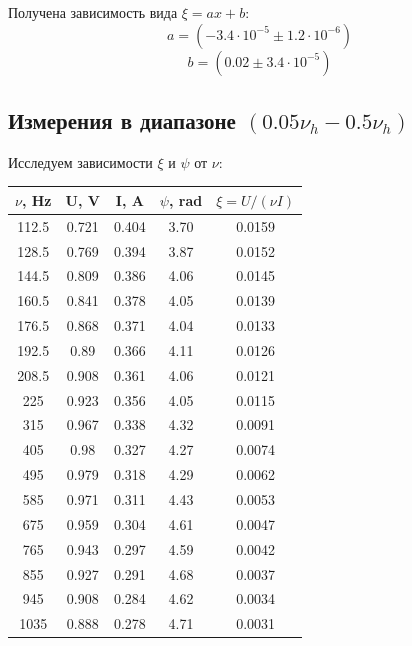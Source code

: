 \documentclass{article}
\begin{document}
Получена зависимость вида \( \xi = ax + b \):
\[ a = (-3.4\cdot 10^{-5} \pm 1.2\cdot 10^{-6}) \]
\[ b = (0.02 \pm 3.4\cdot 10^{-5}) \]
\subsection{Измерения в диапазоне \((0.05\nu_h - 0.5\nu_h)\)}
Исследуем зависимости \(\xi\) и \(\psi\) от \(\nu\):
\begin{table}[H]
    \centering
    \begin{tabular}{|c|c|c|c|c|}
    \hline
    \(\nu\), Hz & U, V  & I, A  & \(\psi\), rad & \(\xi = U/(\nu I)\) \\\hline
    112.5  & 0.721 & 0.404 & 3.70 & 0.0159\\\hline
    128.5  & 0.769 & 0.394 & 3.87 & 0.0152\\\hline
    144.5  & 0.809 & 0.386 & 4.06 & 0.0145\\\hline
    160.5  & 0.841 & 0.378 & 4.05 & 0.0139\\\hline
    176.5  & 0.868 & 0.371 & 4.04 & 0.0133\\\hline
    192.5  & 0.89  & 0.366 & 4.11 & 0.0126\\\hline
    208.5  & 0.908 & 0.361 & 4.06 & 0.0121\\\hline
    225    & 0.923 & 0.356 & 4.05 & 0.0115\\\hline
    315    & 0.967 & 0.338 & 4.32 & 0.0091\\\hline
    405    & 0.98  & 0.327 & 4.27 & 0.0074\\\hline
    495    & 0.979 & 0.318 & 4.29 & 0.0062\\\hline
    585    & 0.971 & 0.311 & 4.43 & 0.0053\\\hline
    675    & 0.959 & 0.304 & 4.61 & 0.0047\\\hline
    765    & 0.943 & 0.297 & 4.59 & 0.0042\\\hline
    855    & 0.927 & 0.291 & 4.68 & 0.0037\\\hline
    945    & 0.908 & 0.284 & 4.62 & 0.0034\\\hline
    1035   & 0.888 & 0.278 & 4.71 & 0.0031\\\hline
    \end{tabular}
\end{table}
\end{document}
